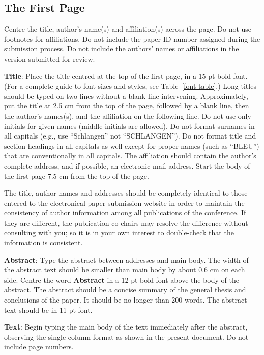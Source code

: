 \documentclass[11pt]{article}
\begin{document}
\subsection{The First Page}
\label{ssec:first}

Centre the title, author's name(s) and affiliation(s) across
the page.
Do not use footnotes for affiliations. Do not include the
paper ID number assigned during the submission process. 
Do not include the authors' names or affiliations in the version submitted for review.

{\bf Title}: Place the title centred at the top of the first page, in
a 15 pt bold font. (For a complete guide to font sizes and styles,
see Table~\ref{font-table}.) Long titles should be typed on two lines
without a blank line intervening. Approximately, put the title at 2.5
cm from the top of the page, followed by a blank line, then the
author's names(s), and the affiliation on the following line. Do not
use only initials for given names (middle initials are allowed). Do
not format surnames in all capitals (e.g., use ``Schlangen'' not
``SCHLANGEN'').  Do not format title and section headings in all
capitals as well except for proper names (such as ``BLEU'') that are
conventionally in all capitals.  The affiliation should contain the
author's complete address, and if possible, an electronic mail
address. Start the body of the first page 7.5 cm from the top of the
page.

The title, author names and addresses should be completely identical
to those entered to the electronical paper submission website in order
to maintain the consistency of author information among all
publications of the conference. If they are different, the publication
co-chairs may resolve the difference without consulting with you; so it
is in your own interest to double-check that the information is
consistent.

{\bf Abstract}: Type the abstract between addresses and main body.
The width of the abstract text should be
smaller than main body by about 0.6 cm on each side.
Centre the word {\bf Abstract} in a 12 pt bold
font above the body of the abstract. The abstract should be a concise
summary of the general thesis and conclusions of the paper. It should
be no longer than 200 words. The abstract text should be in 11 pt font.

{\bf Text}: Begin typing the main body of the text immediately after
the abstract, observing the single-column format as shown in 
the present document. Do not include page numbers.
\end{document}
